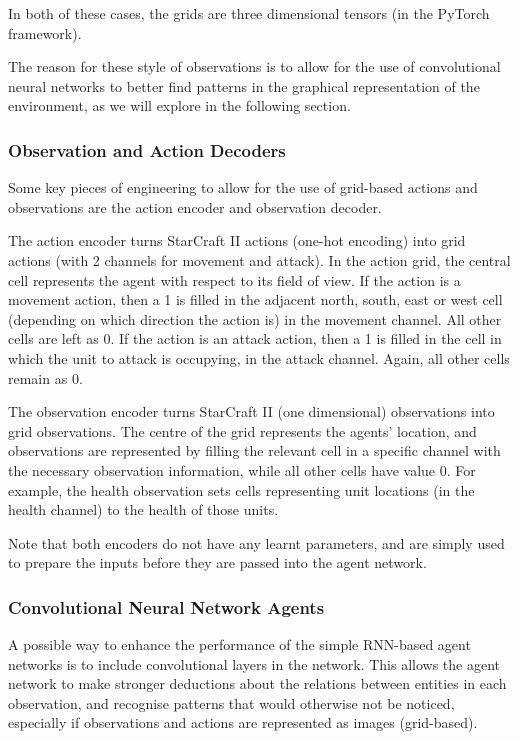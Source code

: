 In both of these cases, the grids are three dimensional tensors (in the PyTorch framework).

The reason for these style of observations is to allow for the use of convolutional neural networks to better find patterns in the graphical representation of the environment, as we will explore in the following section.

\subsubsection{Observation and Action Decoders}

Some key pieces of engineering to allow for the use of grid-based actions and observations are the action encoder and observation decoder. 

The action encoder turns StarCraft II actions (one-hot encoding) into grid actions (with 2 channels for movement and attack). In the action grid, the central cell represents the agent with respect to its field of view. If the action is a movement action, then a 1 is filled in the adjacent north, south, east or west cell (depending on which direction the action is) in the movement channel. All other cells are left as 0. If the action is an attack action, then a 1 is filled in the cell in which the unit to attack is occupying, in the attack channel. Again, all other cells remain as 0. 

The observation encoder turns StarCraft II (one dimensional) observations into grid observations. The centre of the grid represents the agents' location, and observations are represented by filling the relevant cell in a specific channel with the necessary observation information, while all other cells have value 0. For example, the health observation sets cells representing unit locations (in the health channel) to the health of those units. 

Note that both encoders do not have any learnt parameters, and are simply used to prepare the inputs before they are passed into the agent network.

\subsubsection{Convolutional Neural Network Agents}

A possible way to enhance the performance of the simple RNN-based agent networks is to include convolutional layers in the network. This allows the agent network to make stronger deductions about the relations between entities in each observation, and recognise patterns that would otherwise not be noticed, especially if observations and actions are represented as images (grid-based). 

